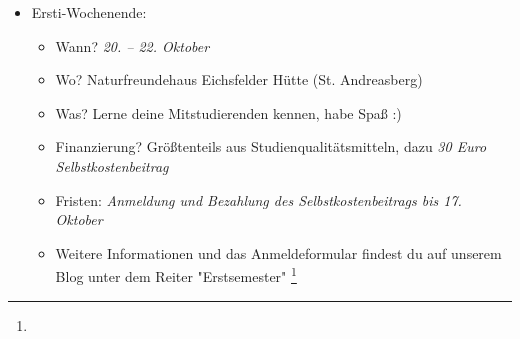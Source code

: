 \begin{itemize}
	\begin{itemize}
		\item 09:45 Uhr: 1. Große Übung Lineare Algebra (PK 2.2)
        \item nachmittags: Treffen Abfahrt Erstifahrt (Foyer Mühlenpfordstraße 23)
	\end{itemize}
	\item Ersti-Wochenende:
	\begin{itemize}
		\item Wann? \emph{20. – 22. Oktober}
		\item Wo? Naturfreundehaus Eichsfelder Hütte (St. Andreasberg)
		\item Was? Lerne deine Mitstudierenden kennen, habe Spaß :)
		\item Finanzierung? Größtenteils aus Studienqualitätsmitteln, dazu \emph{30 Euro Selbstkostenbeitrag}
		\item Fristen: \emph{Anmeldung und Bezahlung des Selbstkostenbeitrags bis 17. Oktober}
		\item Weitere Informationen und das Anmeldeformular findest du auf unserem Blog unter dem Reiter "Erstsemester" \footnote{}
	\end{itemize}
\end{itemize}
